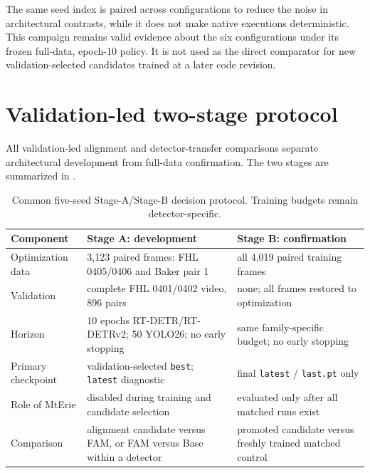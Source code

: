 The same seed index is paired across configurations to reduce the noise in
architectural contrasts, while it does not make native executions deterministic.
This campaign remains valid evidence about the six configurations under its
frozen full-data, epoch-10 policy. It is not used as the direct comparator for
new validation-selected candidates trained at a later code revision.

\section{Validation-led two-stage protocol}
\label{sec:two-stage-protocol}

All validation-led alignment and detector-transfer comparisons separate
architectural development from full-data confirmation. The two stages are summarized in
.

\begin{table}[htbp]
  \centering
  \caption{Common five-seed Stage-A/Stage-B decision protocol. Training budgets
  remain detector-specific.}
  \label{tab:two-stage-protocol}
  \begin{tabularx}{\textwidth}{lXX}
    \toprule
    Component & Stage A: development & Stage B: confirmation \\
    \midrule
    Optimization data
      & 3,123 paired frames: FHL 0405/0406 and Baker pair 1
      & all 4,019 paired training frames \\
    Validation
      & complete FHL 0401/0402 video, 896 pairs
      & none; all frames restored to optimization \\
    Horizon
      & 10 epochs RT-DETR/RT-DETRv2; 50 YOLO26; no early stopping
      & same family-specific budget; no early stopping \\
    Primary checkpoint
      & validation-selected \texttt{best}; \texttt{latest} diagnostic
      & final \texttt{latest} / \texttt{last.pt} only \\
    Role of MtErie
      & disabled during training and candidate selection
      & evaluated only after all matched runs exist \\
    Comparison
      & alignment candidate versus FAM, or FAM versus Base within a detector
      & promoted candidate versus freshly trained matched control \\
    \bottomrule
  \end{tabularx}
\end{table}

